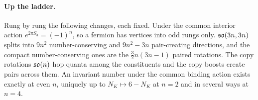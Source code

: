 \paragraph{Up the ladder.} Rung by rung the following changes, each fixed. Under the common interior action $e^{2\pi S_3}=(-1)^n$, so a fermion
has vertices into odd rungs only. $\mathfrak{so}(3n,3n)$ splits into $9n^2$ number-conserving and $9n^2-3n$ pair-creating directions, and the compact
number-conserving ones are the $\tfrac32n(3n-1)$ paired rotations. The copy rotations $\mathfrak{so}(n)$ hop quanta among the constituents and the copy
boosts create pairs across them. An invariant number under the common binding action exists exactly at even $n$, uniquely up to
$N_K\mapsto6-N_K$ at $n=2$ and in several ways at $n=4$.

